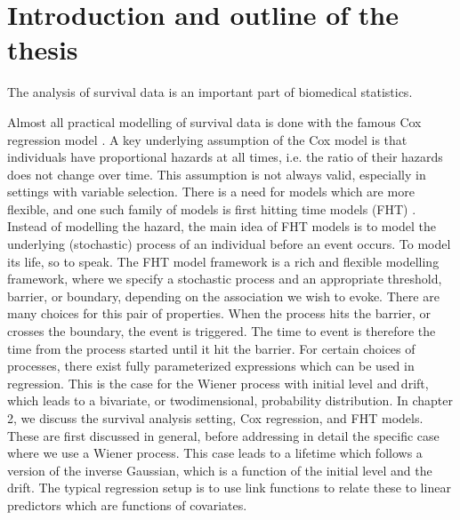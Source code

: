 \chapter{Introduction and outline of the thesis}
\label{sec:intro}
The analysis of survival data is an important part of biomedical statistics.

Almost all practical modelling of survival data is done with the famous Cox regression model \citep{cox-model}.
A key underlying assumption of the Cox model is that individuals have proportional hazards at all times, i.e. the ratio of their hazards does not change over time.
This assumption is not always valid, especially in settings with variable selection.
There is a need for models which are more flexible, and one such family of models is first hitting time models (FHT) \citep{leewhitmore2006}.
Instead of modelling the hazard, the main idea of FHT models is to model the underlying (stochastic) process of an individual before an event occurs.
To model its life, so to speak.
The FHT model framework is a rich and flexible modelling framework, where we specify a stochastic process and an appropriate threshold, barrier, or boundary, depending on the association we wish to evoke.
There are many choices for this pair of properties.
When the process hits the barrier, or crosses the boundary, the event is triggered.
The time to event is therefore the time from the process started until it hit the barrier.
For certain choices of processes, there exist fully parameterized expressions which can be used in regression.
This is the case for the Wiener process with initial level and drift, which leads to a bivariate, or twodimensional, probability distribution.
In chapter 2, we discuss the survival analysis setting, Cox regression, and FHT models.
These are first discussed in general, before addressing in detail the specific case where we use a Wiener process.
This case leads to a lifetime which follows a version of the inverse Gaussian, which is a function of the initial level and the drift.
The typical regression setup is to use link functions to relate these to linear predictors which are functions of covariates.

